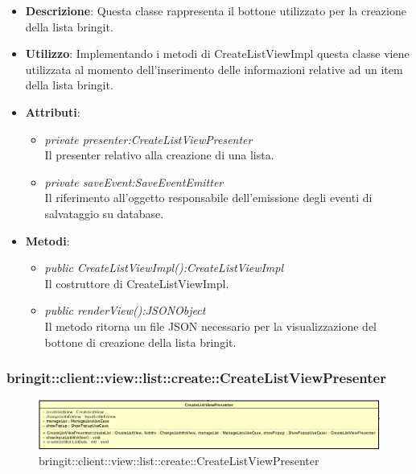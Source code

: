\begin{itemize}
\item \textbf{Descrizione}: Questa classe rappresenta il bottone utilizzato per la creazione della lista bringit.
\item \textbf{Utilizzo}: Implementando i metodi di CreateListViewImpl questa classe viene utilizzata al momento dell'inserimento delle informazioni relative ad un item della lista bringit.
\item \textbf{Attributi}: 
\begin{itemize}
	\item \textit{private presenter:CreateListViewPresenter}\\
	Il presenter relativo alla creazione di una lista.
	\item \textit{private saveEvent:SaveEventEmitter}\\
	Il riferimento all'oggetto responsabile dell'emissione degli eventi di salvataggio su database.
\end{itemize}
\item \textbf{Metodi}:
	\begin{itemize}
	\item \textit{public CreateListViewImpl():CreateListViewImpl}\\
	Il costruttore di CreateListViewImpl.
	\item \textit{public renderView():JSONObject}\\
	Il metodo ritorna un file JSON necessario per la visualizzazione del bottone di creazione della lista bringit.
	\end{itemize}
\end{itemize} 

\subsubsection{bringit::client::view::list::create::CreateListViewPresenter}

\label{bringit::client::view::list::create::CreateListViewPresenter}
\begin{figure}[H]
	\centering
	\includegraphics[scale=0.5]{Sezioni/SottosezioniST/img/app/CreateListViewPresenter.png}
	\caption{bringit::client::view::list::create::CreateListViewPresenter}
\end{figure}

